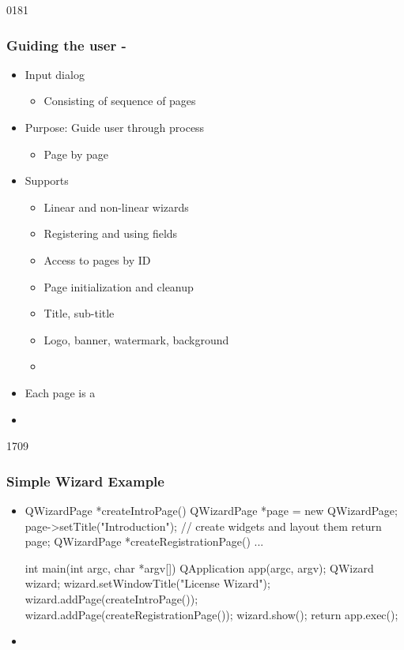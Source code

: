 \begin{slide}{0181}
\frametitle{Guiding the user - }
\begin{itemize}
\item Input dialog
  \begin{itemize}
  \item Consisting of sequence of pages
  \end{itemize}
\item Purpose: Guide user through process
  \begin{itemize}
  \item Page by page
  \end{itemize}
\item Supports
  \begin{itemize}
  \item Linear and non-linear wizards
  \item Registering and using fields
  \item Access to pages by ID
  \item Page initialization and cleanup
  \item Title, sub-title
  \item Logo, banner, watermark, background
  \item {}
  \end{itemize}

\item Each page is a 
\item {}
\end{itemize}
\end{slide}

\begin{slide}[fragile]{1709}
  \frametitle{Simple Wizard Example}
  \begin{itemize}
  \item[]
    \begin{cpp}
QWizardPage *createIntroPage() {
  QWizardPage *page = new QWizardPage;
  page->setTitle("Introduction");
  // create widgets and layout them
  return page;
}
QWizardPage *createRegistrationPage() { ... }

int main(int argc, char *argv[]) {
  QApplication app(argc, argv); 
  QWizard wizard;
  wizard.setWindowTitle("License Wizard");
  wizard.addPage(createIntroPage());
  wizard.addPage(createRegistrationPage()); 
  wizard.show();
  return app.exec();
}      
    \end{cpp}

  \item {}
  \end{itemize}
\end{slide}

